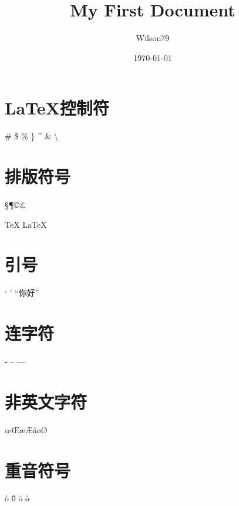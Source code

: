 \documentclass{article}
\title{My First Document}
\author{Wilson79}
\date{\today}
\begin{document}
 
	\tableofcontents %
	\maketitle %
	

	
	\section{LaTeX控制符} 
	\# \$ \% \} \^{}  \& \textbackslash %

	\section{排版符号} 
	\S \P \dag \ddag \copyright \pounds

	\TeX{} \LaTeX{} \LaTeXe{} %

	\section{引号}
	` ' ``你好'' %
	\section{连字符} %
	- -- ---
	\section{非英文字符} 
	\oe \OE \ae \AE \aa \o \O
	\section{重音符号} %
	\`o \^0 \u{o} \r{o}
\end{document}
